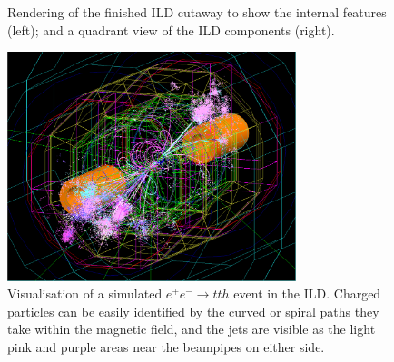 \begin{figure}[h]%
	\centering
    \qquad
    \caption{Rendering of the finished \acrshort{ILD} cutaway to show the internal features (left); and a quadrant view of the \acrshort{ILD} components (right).}%
    \label{figure:colliders/ILD/double}%
\end{figure}

\begin{figure}[h]
	\centering
	\includegraphics[width=0.75\textwidth]{../Pictures/SimulatedEvent1.png}
	\caption{Visualisation of a simulated $e^+ e^- \rightarrow t \overline{t} h$ event in the \acrshort{ILD}. Charged particles can be easily identified by the curved or spiral paths they take within the magnetic field, and the jets are visible as the light pink and purple areas near the beampipes on either side.}
	\label{figure:colliders/ILD/tth-simulation}
\end{figure}

